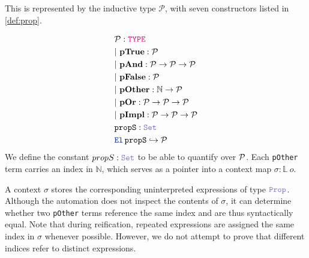 \begin{definition}[$\cal{P}$]\label{def:prop}
This is represented by the inductive type $\mathcal{P}$, with seven constructors listed in \cref{def:prop}.

\begin{align*}
& \cal{P} \index{$\cal{P}$}: \type \\
& |~\textbf{pTrue} : \cal{P} \\
& |~\textbf{pAnd} : \cal{P} \ra \cal{P} \ra \cal{P} \\
& |~\textbf{pFalse} : \cal{P} \\
& |~\textbf{pOther} : \N \ra \cal{P} \\
& |~\textbf{pOr} : \cal{P} \ra \cal{P} \ra \cal{P} \\
& |~\textbf{pImpl} : \cal{P} \ra \cal{P} \ra \cal{P} \\
& \kw{propS} \index{$\kw{propS}$}: \set \\
& \el\,\kw{propS} \re \cal{P}
\end{align*}
We define the constant $propS: \set$ to be able to quantify over $\cal{P}$.
Each \texttt{pOther} term carries an index in $\mathbb{N}$, which serves as a pointer into a context map $\sigma : \mathbb{L}~o$.
\end{definition}

A context $\sigma$ stores the corresponding uninterpreted expressions of type $\prop$.
Although the automation does not inspect the contents of $\sigma$, it can determine whether two \texttt{pOther} terms reference the same index and are thus syntactically equal.
Note that during reification, repeated expressions are assigned the same index in $\sigma$ whenever possible.
However, we do not attempt to prove that different indices refer to distinct expressions.


